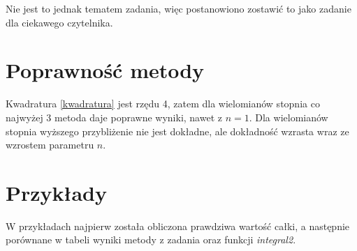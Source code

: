 \documentclass[12pt]{article}
\begin{document}
	Nie jest to jednak tematem zadania, więc postanowiono zostawić to jako zadanie dla ciekawego czytelnika.
	
	
	
	
	\section{Poprawność metody}
	Kwadratura \eqref{kwadratura} jest rzędu 4, zatem dla wielomianów stopnia co najwyżej 3 metoda daje poprawne wyniki, nawet z $n = 1$. Dla wielomianów stopnia wyższego przybliżenie nie jest dokładne, ale dokładność wzrasta wraz ze wzrostem parametru $n$.
	
	
	
	
	\section{Przykłady}
	W przykładach najpierw została obliczona prawdziwa wartość całki, a następnie porównane w tabeli wyniki metody z zadania oraz funkcji \textit{integral2}.
	
\end{document}
